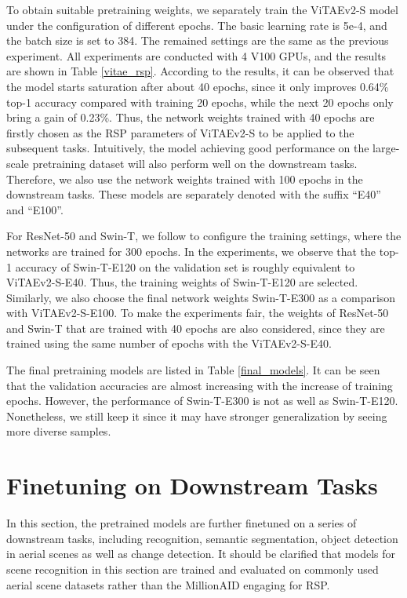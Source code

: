 \documentclass[10pt, journal,twoside]{IEEEtran}
\begin{document}
To obtain suitable pretraining weights, we separately train the ViTAEv2-S model under the configuration of different epochs. The basic learning rate is 5e-4, and the batch size is set to 384. The remained settings are the same as the previous experiment. All experiments are conducted with 4 V100 GPUs, and the results are shown in Table \ref{vitae_rsp}. According to the results, it can be observed that the model starts saturation after about 40 epochs, since it only improves 0.64\% top-1 accuracy compared with training 20 epochs, while the next 20 epochs only bring a gain of 0.23\%. Thus, the network weights trained with 40 epochs are firstly chosen as the RSP parameters of ViTAEv2-S to be applied to the subsequent tasks. Intuitively, the model achieving good performance on the large-scale pretraining dataset will also perform well on the downstream tasks. Therefore, we also use the network weights trained with 100 epochs in the downstream tasks. These models are separately denoted with the suffix ``E40'' and ``E100''.

For ResNet-50 and Swin-T, we follow \cite{swint} to configure the training settings, where the networks are trained for 300 epochs. In the experiments, we observe that the top-1 accuracy of Swin-T-E120 on the validation set is roughly equivalent to ViTAEv2-S-E40. Thus, the training weights of Swin-T-E120 are selected. Similarly, we also choose the final network weights Swin-T-E300 as a comparison with ViTAEv2-S-E100. To make the experiments fair, the weights of ResNet-50 and Swin-T that are trained with 40 epochs are also considered, since they are trained using the same number of epochs with the ViTAEv2-S-E40.

The final pretraining models are listed in Table \ref{final_models}. It can be seen that the validation accuracies are almost increasing with the increase of training epochs. However, the performance of Swin-T-E300 is not as well as Swin-T-E120. Nonetheless, we still keep it since it may have stronger generalization by seeing more diverse samples.

\section{Finetuning on Downstream Tasks}

In this section, the pretrained models are further finetuned on a series of downstream tasks, including recognition, semantic segmentation, object detection in aerial scenes as well as change detection. It should be clarified that models for scene recognition in this section are trained and evaluated on commonly used aerial scene datasets rather than the MillionAID engaging for RSP.
\end{document}
